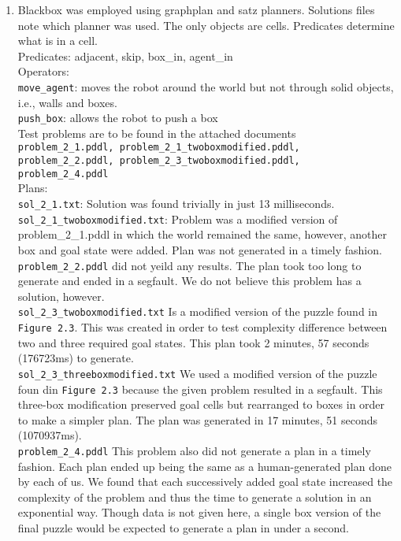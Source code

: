 \documentclass[12pt,a4paper]{report}
\begin{document}
\begin{enumerate}
\begin{enumerate}
	\item
	Blackbox was employed using graphplan and satz planners. Solutions files note which planner was used.
	The only objects are cells. Predicates determine what is in a cell. \\
	Predicates: adjacent, skip, box\_in, agent\_in \\
	Operators: \\
	\texttt{move\_agent}: moves the robot around the world but not through solid objects, i.e., walls and boxes.\\
	\texttt{push\_box}: allows the robot to push a box \\
	Test problems are to be found in the attached documents \\ 
	\texttt{problem\_2\_1.pddl,  problem\_2\_1\_twoboxmodified.pddl, \\ problem\_2\_2.pddl, problem\_2\_3\_twoboxmodified.pddl, \\ problem\_2\_4.pddl} \\
	Plans: \\
	\texttt{sol\_2\_1.txt}: Solution was found trivially in just 13 milliseconds. \\
	\texttt{sol\_2\_1\_twoboxmodified.txt}: Problem was a modified version of problem\_2\_1.pddl in which the world remained the same, however, another box and goal state were added. Plan was not generated in a timely fashion.\\
	\texttt{problem\_2\_2.pddl} did not yeild any results. The plan took too long to generate and ended in a segfault. We do not believe this problem has a solution, however.\\
	\texttt{sol\_2\_3\_twoboxmodified.txt} Is a modified version of the puzzle found in \texttt{Figure 2.3}. This was created in order to test complexity difference between two and three required goal states. This plan took 2 minutes, 57 seconds (176723ms) to generate. \\
	\texttt{sol\_2\_3\_threeboxmodified.txt} We used a modified version of the puzzle foun din \texttt{Figure 2.3} because the given problem resulted in a segfault. This three-box modification preserved goal cells but rearranged to boxes in order to make a simpler plan. The plan was generated in 17 minutes, 51 seconds (1070937ms).\\
	\texttt{problem\_2\_4.pddl} This problem also did not generate a plan in a timely fashion.
	Each plan ended up being the same as a human-generated plan done by each of us. We found that each successively added goal state increased the complexity of the problem and thus the time to generate a solution in an exponential way. Though data is not given here, a single box version of the final puzzle would be expected to generate a plan in under a second.
	

\end{enumerate}
\end{enumerate}
\end{document}
